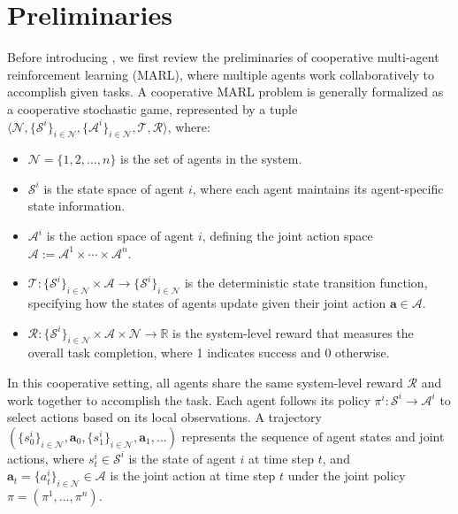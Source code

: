 \section{Preliminaries}

Before introducing \modelname, we first review the preliminaries of cooperative multi-agent reinforcement learning (MARL), where multiple agents work collaboratively to accomplish given tasks.
A cooperative MARL problem is generally formalized as a cooperative stochastic game, represented by a tuple $\langle\mathcal{N}, \{\mathcal{S}^i\}_{i \in \mathcal{N}}, \{\mathcal{A}^i\}_{i\in \mathcal{N}},\mathcal{T},\mathcal{R}\rangle$, where:
\begin{itemize}[topsep=1pt, partopsep=1pt, leftmargin=12pt, itemsep=-1pt]
\item $\mathcal{N}=\{1,2,...,n\}$ is the set of agents in the system. %
\item $\mathcal{S}^i$ is the state space of agent $i$, where each agent maintains its agent-specific state information.
\item $\mathcal{A}^i$ is the action space of agent $i$, defining the joint action space $\mathcal{A}:=\mathcal{A}^1 \times \cdots \times \mathcal{A}^n$.
\item $\mathcal{T}: \{\mathcal{S}^i\}_{i\in \mathcal{N}} \times \mathcal{A} \rightarrow \{\mathcal{S}^i\}_{i\in \mathcal{N}}$ is the deterministic state transition function, specifying how the states of agents update given their joint action $\bm{a} \in \mathcal{A}$.
\item $\mathcal{R}: \{\mathcal{S}^i\}_{i\in \mathcal{N}} \times \mathcal{A} \times \mathcal{N} \rightarrow \mathbb{R}$ is the system-level reward that measures the overall task completion, where 1 indicates success and 0 otherwise.
\end{itemize}
In this cooperative setting, all agents share the same system-level reward $\mathcal{R}$ and work together to accomplish the task. Each agent follows its policy $\pi^i: \mathcal{S}^i \rightarrow \mathcal{A}^i$ to select actions based on its local observations. A trajectory $(\{s_0^i\}_{i\in \mathcal{N}}, \bm{a}_0, \{s_1^i\}_{i\in \mathcal{N}}, \bm{a}_1, ...)$ represents the sequence of agent states and joint actions, where $s_t^i \in \mathcal{S}^i$ is the state of agent $i$ at time step $t$, and $\bm{a}_t = \{a^i_t\}_{i\in\mathcal{N}} \in \mathcal{A}$ is the joint action at time step $t$ under the joint policy $\pi = (\pi^1, ..., \pi^n)$.


